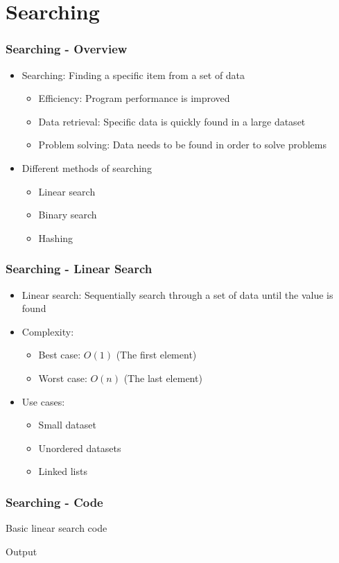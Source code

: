 \section{Searching}
\begin{frame}\frametitle{Searching - Overview}
\begin{itemize}
\item Searching: Finding a specific item from a set of data
	\begin{itemize}
	\item Efficiency: Program performance is improved
	\item Data retrieval: Specific data is quickly found in a large dataset
	\item Problem solving: Data needs to be found in order to solve problems
	\end{itemize}
\item Different methods of searching
	\begin{itemize}
	\item Linear search
	\item Binary search
	\item Hashing
	\end{itemize}
\end{itemize}
\end{frame}

\begin{frame}\frametitle{Searching - Linear Search}
\begin{itemize}
\item Linear search: Sequentially search through a set of data until the value is found
\item Complexity:
	\begin{itemize}
	\item Best case: $O(1)$ (The first element)
	\item Worst case: $O(n)$ (The last element)
	\end{itemize}
\item Use cases:
	\begin{itemize}
	\item Small dataset
	\item Unordered datasets
	\item Linked lists
	\end{itemize}
\end{itemize}
\end{frame}

\begin{frame}\frametitle{Searching - Code}
Basic linear search code


Output

\end{frame}

